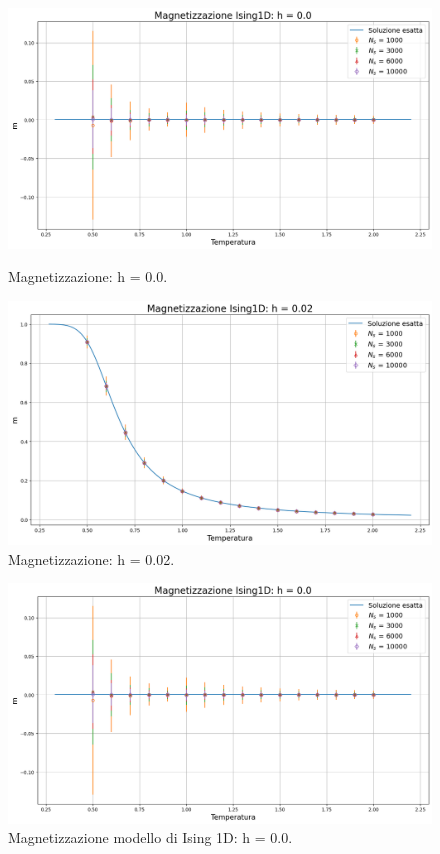 \begin{figure}[htbp]
    \centering
    \begin{minipage}{0.5\textwidth}  
      \centering
      \includegraphics[page=1, width=\textwidth]{Immagini/simIsing1D/magn_h0.0.png}
      \caption{Magnetizzazione: h = 0.0.}
    \end{minipage}\hfill
    \begin{minipage}{0.5\textwidth}  
      \centering
      \includegraphics[page=1, width=\textwidth]{Immagini/simIsing1D/magn_h0.02.png}
      \caption{Magnetizzazione: h = 0.02.}
    \end{minipage}
\end{figure}

\begin{figure}[H]
    \centering
    \includegraphics[width=\textwidth]{Immagini/simIsing1D/magn_h0.0.png}
    \caption{Magnetizzazione modello di Ising 1D: h = 0.0.}
    \label{fig: magn_Ising1D_h0.0}
\end{figure}

